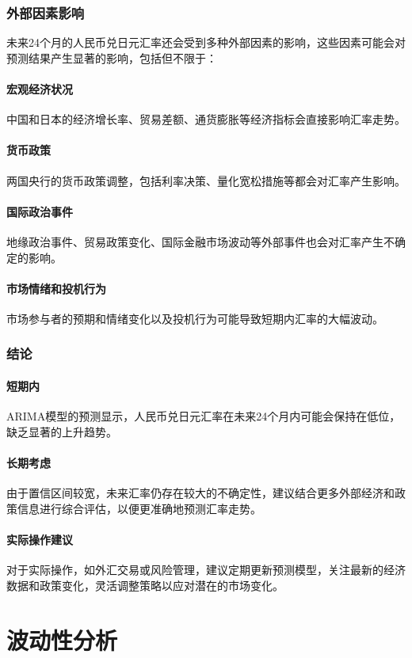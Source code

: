 \subsubsection{外部因素影响}
未来24个月的人民币兑日元汇率还会受到多种外部因素的影响，这些因素可能会对预测结果产生显著的影响，包括但不限于：
\paragraph{宏观经济状况}中国和日本的经济增长率、贸易差额、通货膨胀等经济指标会直接影响汇率走势。
\paragraph{货币政策}两国央行的货币政策调整，包括利率决策、量化宽松措施等都会对汇率产生影响。
\paragraph{国际政治事件}地缘政治事件、贸易政策变化、国际金融市场波动等外部事件也会对汇率产生不确定的影响。
\paragraph{市场情绪和投机行为}市场参与者的预期和情绪变化以及投机行为可能导致短期内汇率的大幅波动。

\subsubsection{结论}
\paragraph{短期内}ARIMA模型的预测显示，人民币兑日元汇率在未来24个月内可能会保持在低位，缺乏显著的上升趋势。
\paragraph{长期考虑}由于置信区间较宽，未来汇率仍存在较大的不确定性，建议结合更多外部经济和政策信息进行综合评估，以便更准确地预测汇率走势。
\paragraph{实际操作建议}对于实际操作，如外汇交易或风险管理，建议定期更新预测模型，关注最新的经济数据和政策变化，灵活调整策略以应对潜在的市场变化。

\section{波动性分析}
